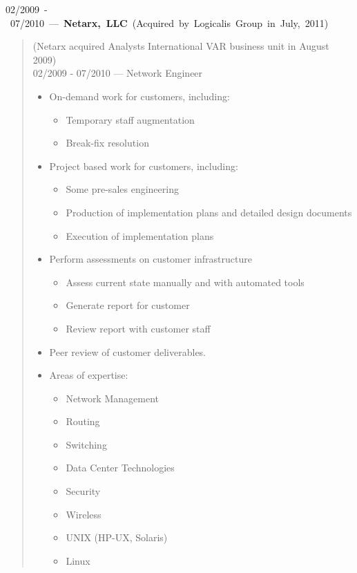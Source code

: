 \mbox{02/2009 - 07/2010 --- {\bf Netarx, LLC} (Acquired by Logicalis Group in July, 2011)}
\begin{quote}
(Netarx acquired Analysts International VAR business unit in August 2009)\\
02/2009 - 07/2010 --- Network Engineer\\
\begin{itemize}
\item On-demand work for customers, including:
\begin{itemize}
\item Temporary staff augmentation
\item Break-fix resolution
\end{itemize}
\item Project based work for customers, including:
\begin{itemize}
\item Some pre-sales engineering
\item Production of implementation plans and detailed design documents
\item Execution of implementation plans
\end{itemize}
\item Perform assessments on customer infrastructure
\begin{itemize}
\item Assess current state manually and with automated tools
\item Generate report for customer
\item Review report with customer staff
\end{itemize}
\item Peer review of customer deliverables.
\item Areas of expertise:
\begin{itemize}
\item Network Management
\item Routing
\item Switching
\item Data Center Technologies
\item Security
\item Wireless
\item UNIX (HP-UX, Solaris)
\item Linux
\end{itemize}
\end{itemize}
\end{quote}
